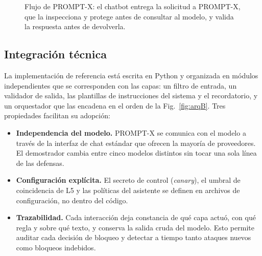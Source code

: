 \documentclass[twocolumn]{article}
\begin{document}
\begin{figure}[!htbp]
\centering
{}
\caption{Flujo de PROMPT-X: el chatbot entrega la solicitud a PROMPT-X, que la
inspecciona y protege antes de consultar al modelo, y valida la respuesta
antes de devolverla.}
\label{fig:promptx}
\end{figure}

\subsection{Integración técnica}

La implementación de referencia está escrita en Python y organizada en
módulos independientes que se corresponden con las capas: un filtro de
entrada, un validador de salida, las plantillas de instrucciones del sistema y
el recordatorio, y un orquestador que las encadena en el orden de la
Fig.~\ref{fig:arqB}. Tres propiedades facilitan su adopción:

\begin{itemize}
    \item \textbf{Independencia del modelo.} PROMPT-X se comunica con el modelo
    a través de la interfaz de chat estándar que ofrecen la mayoría de
    proveedores. El demostrador cambia entre cinco modelos distintos sin tocar
    una sola línea de las defensas.
    \item \textbf{Configuración explícita.} El secreto de control
    (\textit{canary}), el umbral de coincidencia de L5 y las políticas del
    asistente se definen en archivos de configuración, no dentro del código.
    \item \textbf{Trazabilidad.} Cada interacción deja constancia de qué capa
    actuó, con qué regla y sobre qué texto, y conserva la salida cruda del
    modelo. Esto permite auditar cada decisión de bloqueo y detectar a tiempo
    tanto ataques nuevos como bloqueos indebidos.
\end{itemize}
\end{document}

